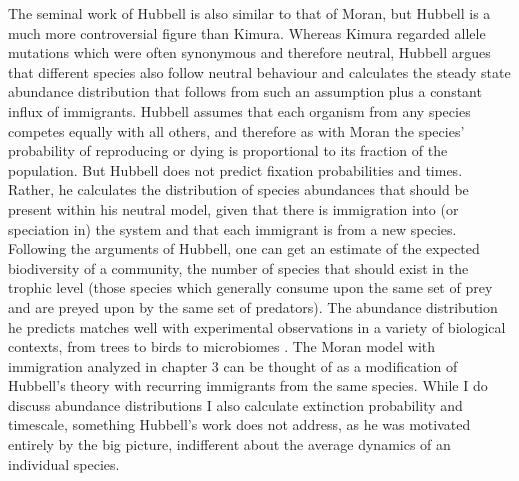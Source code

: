 The seminal work of Hubbell \cite{Hubbell2001} is also similar to that of Moran, but Hubbell is a much more controversial figure than Kimura.
Whereas Kimura regarded allele mutations which were often synonymous and therefore neutral, Hubbell argues that different species also follow neutral behaviour and calculates the steady state abundance distribution that follows from such an assumption plus a constant influx of immigrants. %
Hubbell assumes that each organism from any species competes equally with all others, and therefore as with Moran the species' probability of reproducing or dying is proportional to its fraction of the population.
But Hubbell does not predict fixation probabilities and times.
Rather, he calculates the distribution of species abundances that should be present within his neutral model, given that there is immigration into (or speciation in) the system and that each immigrant is from a new species. 
Following the arguments of Hubbell, one can get an estimate of the expected biodiversity of a community, the number of species that should exist in the trophic level (those species which generally consume upon the same set of prey and are preyed upon by the same set of predators). 
The abundance distribution he predicts matches well with experimental observations in a variety of biological contexts, from trees to birds to microbiomes \cite{Hubbell2001}. 
The Moran model with immigration analyzed in chapter 3 can be thought of as a modification of Hubbell's theory with recurring immigrants from the same species. 
While I do discuss abundance distributions I also calculate extinction probability and timescale, something Hubbell's work does not address, as he was motivated entirely by the big picture, indifferent about the average dynamics of an individual species. 

